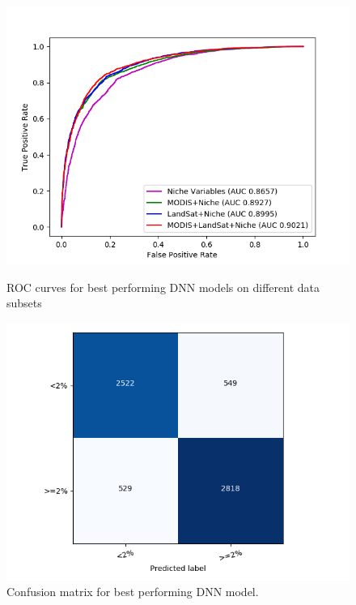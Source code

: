 \documentclass{article} %
\begin{document}
\begin{figure}
\centering
\begin{minipage}{.48\textwidth}
  \centering
\includegraphics[width=\textwidth]{pics/roc.png}
\caption{ROC curves for best performing DNN models on different data subsets}
\end{minipage}
\begin{minipage}{.04\textwidth}
\end{minipage}
\begin{minipage}{.48\textwidth}
  \centering
\includegraphics[width=\textwidth]{pics/confusion_MODIS+LandSat+Niche.png}
\caption{Confusion matrix for best performing DNN model.}\label{confusion}
\end{minipage}
\end{figure}
\end{document}
